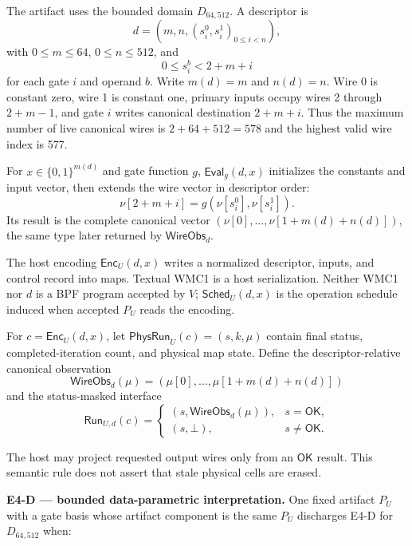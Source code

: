 \documentclass[conference]{IEEEtran}
\begin{document}
The artifact uses the bounded domain $D_{64,512}$. A descriptor is
\begin{equation}
d=(m,n,(s_i^0,s_i^1)_{0\le i<n}),
\end{equation}
with $0\le m\le64$, $0\le n\le512$, and
\begin{equation}
0\le s_i^b<2+m+i
\end{equation}
for each gate $i$ and operand $b$. Write $m(d)=m$ and $n(d)=n$. Wire 0 is constant zero, wire 1 is constant one, primary inputs occupy wires 2 through $2+m-1$, and gate $i$ writes canonical destination $2+m+i$. Thus the maximum number of live canonical wires is $2+64+512=578$ and the highest valid wire index is 577.

For $x\in\{0,1\}^{m(d)}$ and gate function $g$, $\mathsf{Eval}_g(d,x)$ initializes the constants and input vector, then extends the wire vector in descriptor order:
\begin{equation}
\nu[2+m+i]=g(\nu[s_i^0],\nu[s_i^1]).
\end{equation}
Its result is the complete canonical vector $(\nu[0],\ldots,\nu[1+m(d)+n(d)])$, the same type later returned by $\mathsf{WireObs}_d$.

The host encoding $\mathsf{Enc}_U(d,x)$ writes a normalized descriptor, inputs, and control record into maps. Textual WMC1 is a host serialization. Neither WMC1 nor $d$ is a BPF program accepted by $V$; $\mathsf{Sched}_U(d,x)$ is the operation schedule induced when accepted $P_U$ reads the encoding.

For $c=\mathsf{Enc}_U(d,x)$, let $\mathsf{PhysRun}_U(c)=(s,k,\mu)$ contain final status, completed-iteration count, and physical map state. Define the descriptor-relative canonical observation
\begin{equation}
\mathsf{WireObs}_d(\mu)
=(\mu[0],\ldots,\mu[1+m(d)+n(d)])
\end{equation}
and the status-masked interface
\begin{equation}
\mathsf{Run}_{U,d}(c)=
\begin{cases}
(s,\mathsf{WireObs}_d(\mu)),&s=\mathsf{OK},\\
(s,\bot),&s\ne\mathsf{OK}.
\end{cases}
\end{equation}

The host may project requested output wires only from an $\mathsf{OK}$ result. This semantic rule does not assert that stale physical cells are erased.

\medskip
\noindent\textbf{E4-D --- bounded data-parametric interpretation.}
One fixed artifact $P_U$ with a gate basis whose artifact component is the same $P_U$ discharges E4-D for $D_{64,512}$ when:
\end{document}
